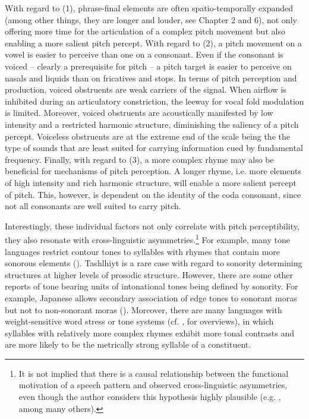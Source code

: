 With regard to (1), phrase-final elements are often spatio-temporally expanded (among other things, they are longer and louder, see Chapter 2 and 6), not only offering more time for the articulation of a complex pitch movement but also enabling a more salient pitch percept. With regard to (2), a pitch movement on a vowel is easier to perceive than one on a consonant. Even if the consonant is voiced – clearly a prerequisite for pitch – a pitch target is easier to perceive on nasals and liquids than on fricatives and stops. In terms of pitch perception and production, voiced obstruents are weak carriers of the signal. When airflow is inhibited during an articulatory constriction, the leeway for vocal fold modulation is limited. Moreover, voiced obstruents are acoustically manifested by low intensity and a restricted harmonic structure, diminishing the saliency of a pitch percept. Voiceless obstruents are at the extreme end of the scale being the the type of sounds that are least suited for carrying information cued by fundamental frequency. Finally, with regard to (3), a more complex rhyme may also be beneficial for mechanisms of pitch perception. A longer rhyme, i.e. more elements of high intensity and rich harmonic structure, will enable a more salient percept of pitch. This, however, is dependent on the identity of the coda consonant, since not all consonants are well suited to carry pitch. 

Interestingly, these individual factors not only correlate with pitch perceptibility, they also resonate with cross-linguistic asymmetries.\footnote{It is not implied that there is a causal relationship between the functional motivation of a speech pattern and observed cross-linguistic asymmetries, even though the author considers this hypothesis highly plausible (e.g. \citealt{Ohala1993,Blevins2004}, among many others).} For example, many tone languages restrict contour tones to syllables with rhymes that contain more sonorous elements (\citealt{Zhang2001,Gordon2004}). Tashlhiyt is a rare case with regard to sonority determining structures at higher levels of prosodic structure. However, there are some other reports of tone bearing units of intonational tones being defined by sonority. For example, Japanese allows secondary association of edge tones to sonorant moras but not to non-sonorant moras (\citealt{PierrBeck1988}). Moreover, there are many languages with weight-sensitive word stress or tone systems (cf. \citealt{DeLacy2002,DeLacy2007,Gordon2004,Gordon2006}, for overviews), in which syllables with relatively more complex rhymes exhibit more tonal contrasts and are more likely to be the metrically strong syllable of a constituent.  

